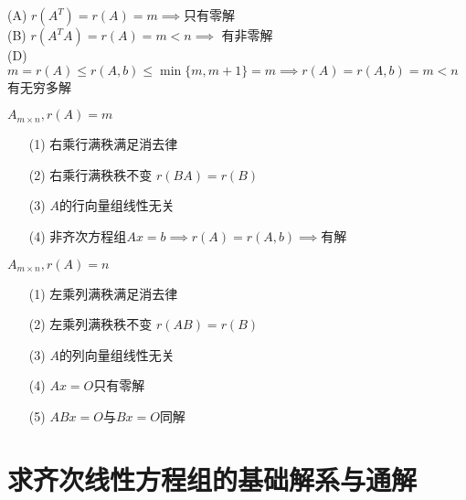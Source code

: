 \documentclass[12pt, a4paper, oneside, UTF8]{ctexbook}
\begin{document}
\begin{enumerate}
    \begin{solution}
    (A) $r(A^T)=r(A)=m \implies $只有零解 \\
    (B) $r(A^TA)=r(A)=m<n \implies$ 有非零解 \\
    (D) $m=r(A)\leq r(A,b)\leq \min\{m,m+1\} = m \implies r(A)=r(A,b)=m<n$有无穷多解 
    \end{solution}

    \begin{corollary}[行/列满秩总结]
        $A_{m\times n}, r(A)=m$
        \begin{enumerate}
            \item [(1)] 右乘行满秩满足消去律 
            \item [(2)] 右乘行满秩秩不变 $r(BA)=r(B)$ 
            \item [(3)] $A$的行向量组线性无关 
            \item [(4)] 非齐次方程组$Ax=b\implies r(A)=r(A,b)\implies$有解
        \end{enumerate}
        $A_{m\times n}, r(A)=n$
        \begin{enumerate}
            \item [(1)] 左乘列满秩满足消去律 
            \item [(2)] 左乘列满秩秩不变 $r(AB)=r(B)$ 
            \item [(3)] $A$的列向量组线性无关 
            \item [(4)] $Ax=O$只有零解 
            \item [(5)] $ABx=O$与$Bx=O$同解
        \end{enumerate}
    \end{corollary}
\end{enumerate}

\section{求齐次线性方程组的基础解系与通解}
\end{document}
